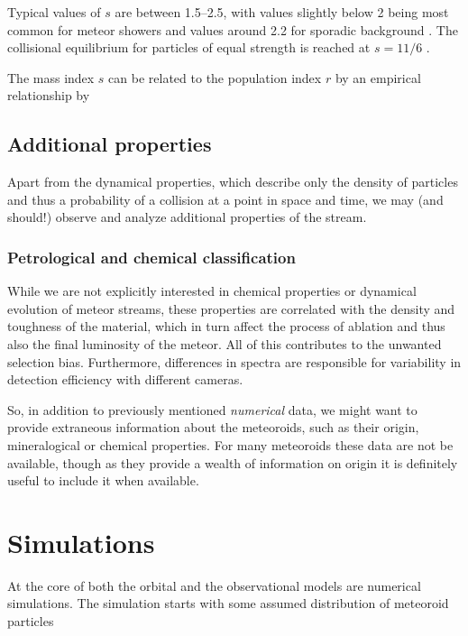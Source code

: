             Typical values of $s$ are between \numrange{1.5}{2.5}, with values slightly below 2 being most common
            for meteor showers and values around \num{2.2} for sporadic background \citep{blaauw+2011}.
            The collisional equilibrium for particles of equal strength is reached at $s = 11/6$ \citep{dohnanyi1969}.

            The mass index $s$ can be related to the population index $r$ by an empirical relationship by \citet{koschack+1990}


    \subsection{Additional properties} \label{mpa}
        Apart from the dynamical properties, which describe only the density of particles
        and thus a probability of a collision at a point in space and time,
        we may (and should!) observe and analyze additional properties of the stream.

        \subsubsection{Petrological and chemical classification} \label{mpac}
            While we are not explicitly interested in chemical properties
            or dynamical evolution of meteor streams, these properties
            are correlated with the density and toughness of the material,
            which in turn affect the process of ablation
            and thus also the final luminosity of the meteor.
            All of this contributes to the unwanted selection bias.
            Furthermore, differences in spectra are responsible for
            variability in detection efficiency with different cameras.

            So, in addition to previously mentioned \textit{numerical} data, we might want to
            provide extraneous information about the meteoroids, such as their origin,
            mineralogical or chemical properties.
            For many meteoroids these data are not be available,
            though as they provide a wealth of information on origin
            it is definitely useful to include it when available.


\section{Simulations} \label{mi}
    At the core of both the orbital and the observational models are numerical simulations.
    The simulation starts with some assumed distribution of meteoroid particles

